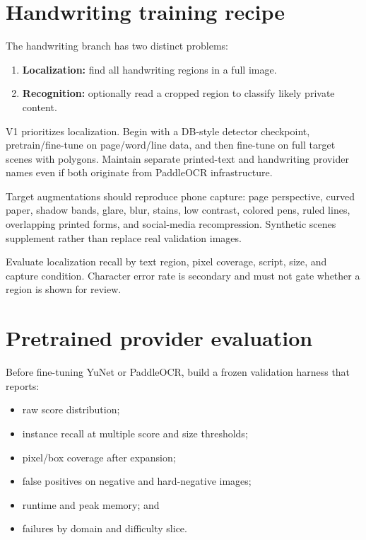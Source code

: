 \section{Handwriting training recipe}

The handwriting branch has two distinct problems:

\begin{enumerate}[leftmargin=7mm]
  \item \textbf{Localization:} find all handwriting regions in a full image.
  \item \textbf{Recognition:} optionally read a cropped region to classify likely private content.
\end{enumerate}

V1 prioritizes localization. Begin with a DB-style detector checkpoint, pretrain/fine-tune on page/word/line data, and then fine-tune on full target scenes with polygons. Maintain separate printed-text and handwriting provider names even if both originate from PaddleOCR infrastructure.

Target augmentations should reproduce phone capture: page perspective, curved paper, shadow bands, glare, blur, stains, low contrast, colored pens, ruled lines, overlapping printed forms, and social-media recompression. Synthetic scenes supplement rather than replace real validation images.

Evaluate localization recall by text region, pixel coverage, script, size, and capture condition. Character error rate is secondary and must not gate whether a region is shown for review.

\section{Pretrained provider evaluation}

Before fine-tuning YuNet or PaddleOCR, build a frozen validation harness that reports:

\begin{itemize}[leftmargin=6mm]
  \item raw score distribution;
  \item instance recall at multiple score and size thresholds;
  \item pixel/box coverage after expansion;
  \item false positives on negative and hard-negative images;
  \item runtime and peak memory; and
  \item failures by domain and difficulty slice.
\end{itemize}

